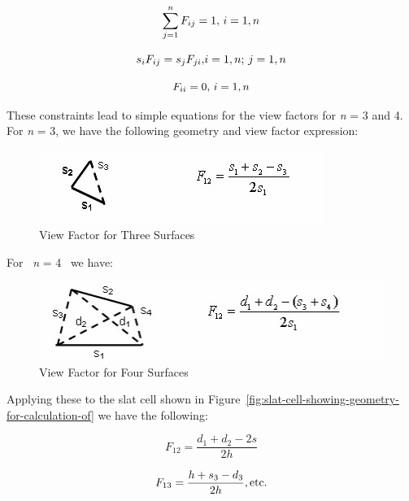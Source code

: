 \begin{equation}
\sum\limits_{j = 1}^n {{F_{ij}} = 1{\rm{,  }}~i = 1,n}
\end{equation}

\begin{equation}
{s_i}{F_{ij}} = {s_j}{F_{ji}}{\rm{,  }}i = 1,n{\rm{;  }}~j = 1,n
\end{equation}

\begin{equation}
{F_{ii}} = 0{\rm{,  }}~i = 1,n
\end{equation}

These constraints lead to simple equations for the view factors for \emph{n} = 3 and 4. For \emph{n} = 3, we have the following geometry and view factor expression:

\begin{figure}[htbp]
\centering
\includegraphics{media/image1059.png}
\caption{View Factor for Three Surfaces}
\end{figure}

For~ \emph{n} = 4~ we have:

\begin{figure}[htbp]
\centering
\includegraphics{media/image1060.png}
\caption{View Factor for Four Surfaces}
\end{figure}

Applying these to the slat cell shown in Figure~\ref{fig:slat-cell-showing-geometry-for-calculation-of} we have the following:

\begin{equation}
{F_{12}} = \frac{{{d_1} + {d_2} - 2s}}{{2h}}
\end{equation}

\begin{equation}
{F_{13}} = \frac{{h + {s_3} - {d_3}}}{{2h}}{\rm{ ,  etc}}{\rm{.}}
\end{equation}


